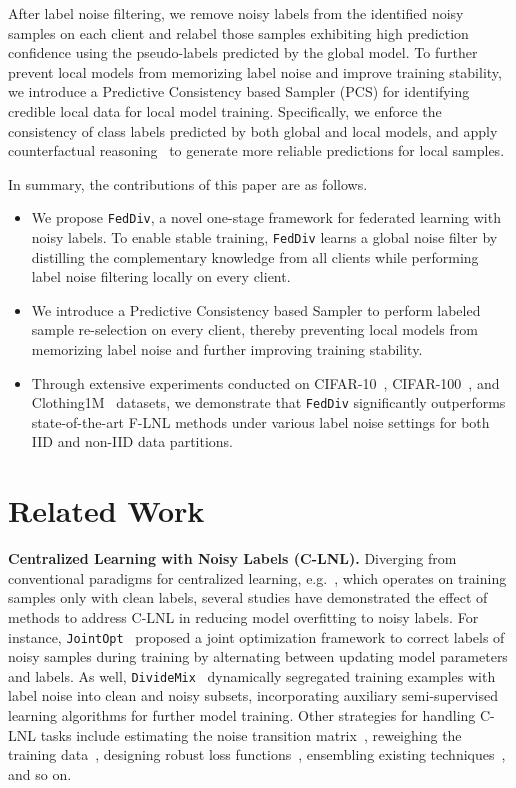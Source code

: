 \documentclass[letterpaper]{article} %
\begin{document}
After label noise filtering, we remove noisy labels from the identified noisy samples on each client and relabel those samples exhibiting high prediction confidence using the pseudo-labels predicted by the global model. To further prevent local models from memorizing label noise and improve training stability, we introduce a Predictive Consistency based Sampler (PCS) for identifying credible local data for local model training. Specifically, we enforce the consistency of class labels predicted by both global and local models, and apply counterfactual reasoning~\cite{holland1986statistics, debiasedlearning} to generate more reliable predictions for local samples.

In summary, the contributions of this paper are as follows.
\begin{itemize}
    \item We propose \texttt{FedDiv}, a novel one-stage framework for federated learning with noisy labels. To enable stable training, \texttt{FedDiv} learns a global noise filter by distilling the complementary knowledge from all clients while performing label noise filtering locally on every client.

    \item We introduce a Predictive Consistency based Sampler to perform labeled sample re-selection on every client, thereby preventing local models from memorizing label noise and further improving training stability.

    \item Through extensive experiments conducted on CIFAR-10~\cite{cifar}, CIFAR-100~\cite{cifar}, and Clothing1M~\cite{clothing1m} datasets, we demonstrate that \texttt{FedDiv} significantly outperforms state-of-the-art F-LNL methods under various label noise settings for both IID and non-IID data partitions.
\end{itemize}

\section{Related Work}

\noindent
\textbf{Centralized Learning with Noisy Labels (C-LNL).}
Diverging from conventional paradigms for centralized learning, e.g.~\cite{li2023betweenness, li2023idm}, which operates on training samples only with clean labels, several studies have demonstrated the effect of methods to address C-LNL in reducing model overfitting to noisy labels. For instance, \texttt{JointOpt}~\cite{JointOpt} proposed a joint optimization framework to correct labels of noisy samples during training by alternating between updating model parameters and labels. As well, \texttt{DivideMix}~\cite{li2019dividemix} dynamically segregated training examples with label noise into clean and noisy subsets, incorporating auxiliary semi-supervised learning algorithms for further model training. Other strategies for handling C-LNL tasks include estimating the noise transition matrix~\cite{cheng2022instance}, reweighing the training data~\cite{ren2018learning}, designing robust loss functions~\cite{englesson2021generalized}, ensembling existing techniques~\cite{li2022neighborhood}, and so on.
\end{document}
